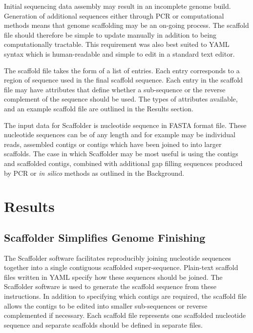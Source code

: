 \documentclass[10pt]{bmc_article}
\newenvironment{bmcformat}{\begin{raggedright}\baselineskip20pt\sloppy\setboolean{publ}{false}}{\end{raggedright}\baselineskip20pt\sloppy}
\begin{document}
\begin{bmcformat}
Initial sequencing data assembly may result in an incomplete genome build.
Generation of additional sequences either through PCR or computational methods
means that genome scaffolding may be an on-going process. The scaffold file
should therefore be simple to update manually in addition to being
computationally tractable. This requirement was also best suited to YAML syntax
which is human-readable and simple to edit in a standard text editor. \pb

The scaffold file takes the form of a list of entries. Each entry corresponds
to a region of sequence used in the final scaffold sequence. Each entry in the
scaffold file may have attributes that define whether a sub-sequence or the
reverse complement of the sequence should be used. The types of attributes
available, and an example scaffold file are outlined in the Results section.
\pb

The input data for Scaffolder is nucleotide sequence in FASTA format file.
These nucleotide sequences can be of any length and for example may be
individual reads, assembled contigs or contigs which have been joined to into
larger scaffolds. The case in which Scaffolder may be most useful is using the
contigs and scaffolded contigs, combined with additional gap filling sequences
produced by PCR or \emph{in silico} methods as outlined in the Background. \pb

\clearpage

\section*{Results} %

\subsection*{Scaffolder Simplifies Genome Finishing} %

The Scaffolder software facilitates reproducibly joining nucleotide sequences
together into a single contiguous scaffolded super-sequence. Plain-text
scaffold files written in YAML specify how these sequences should be joined.
The Scaffolder software is used to generate the scaffold sequence from these
instructions. In addition to specifying which contigs are required, the
scaffold file allows the contigs to be edited into smaller sub-sequences or
reverse complemented if necessary. Each scaffold file represents one scaffolded
nucleotide sequence and separate scaffolds should be defined in separate files.
\pb


\end{bmcformat}
\end{document}
